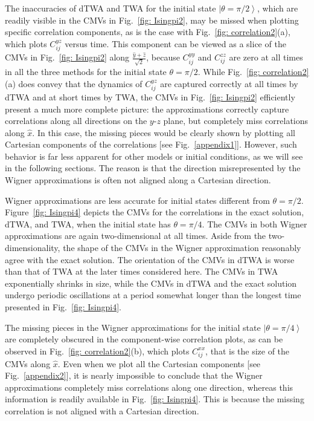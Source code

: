 \documentclass[pra,reprint,superscriptaddress]{revtex4-1}
\newcommand{\ket}[1]{\left| #1 \right\rangle}
\begin{document}
The inaccuracies of dTWA and TWA for the initial state $\ket{\theta=\pi/2}$, which are readily visible in the CMVs in Fig.~\ref{fig: Isingpi2}, may be missed when plotting specific correlation components, as is the case with Fig.~\ref{fig: correlation2}(a), which plots $C^{yz}_{ij}$ versus time. This component can be viewed as a slice of the CMVs in Fig.~\ref{fig: Isingpi2} along $\frac{\hat{y}+\hat{z}}{\sqrt{2}}$, because $C^{yy}_{ij}$ and $C^{zz}_{ij}$ are zero at all times in all the three methods for the initial state $\theta=\pi/2$. While Fig.~\ref{fig: correlation2}(a) does convey that the dynamics of $C^{yz}_{ij}$ are captured correctly at all times by dTWA and at short times by TWA, the CMVs in Fig.~\ref{fig: Isingpi2} efficiently present a much more complete picture: the approximations correctly capture correlations along all directions on the $y$-$z$ plane, but completely miss correlations along $\hat{x}$. In this case, the missing pieces would be clearly shown by plotting all Cartesian components of the correlations [see Fig.~\ref{appendix1}]. However, such behavior is far less apparent for other models or initial conditions, as we will see in the following sections. The reason is that the direction misrepresented by the Wigner approximations is often not aligned along a Cartesian direction.

Wigner approximations are less accurate for initial states different from $\theta=\pi/2$. Figure~\ref{fig: Isingpi4} depicts the CMVs for the correlations in the exact solution, dTWA, and TWA, when the initial state has $\theta=\pi/4$. 
The CMVs in both Wigner approximations are again two-dimensional at all times. Aside from the two-dimensionality, the shape of the CMVs in the Wigner approximation reasonably agree with the exact solution. The orientation of the CMVs in dTWA is worse than that of TWA at the later times considered here. The CMVs in TWA exponentially shrinks in size, while the CMVs in dTWA and the exact solution undergo periodic oscillations at a period somewhat longer than the longest time presented in Fig.~\ref{fig: Isingpi4}.

The missing pieces in the Wigner approximations for the initial state $\ket{\theta=\pi/4}$ are completely obscured in the component-wise correlation plots, as can be observed in Fig.~\ref{fig: correlation2}(b), which plots $C^{xx}_{ij}$, that is the size of the CMVs along $\hat{x}$. Even when we plot all the Cartesian components [see Fig.~\ref{appendix2}], it is nearly impossible to conclude that the Wigner approximations completely miss correlations along one direction, whereas this information is readily available in Fig.~\ref{fig: Isingpi4}. This is because the missing correlation is not aligned with a Cartesian direction.
\end{document}
